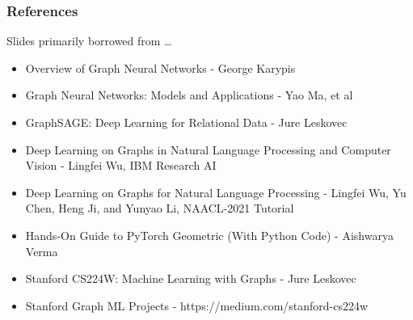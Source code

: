 \begin{frame}[fragile]\frametitle{References}
Slides primarily borrowed from \ldots

\begin{itemize}
\item Overview of Graph Neural Networks - George Karypis
\item Graph Neural Networks: Models and Applications - Yao Ma, et al
\item GraphSAGE: Deep Learning for Relational Data - Jure Leskovec
\item Deep Learning on Graphs in Natural Language Processing and Computer Vision - Lingfei Wu, IBM Research AI
\item Deep Learning on Graphs for Natural Language Processing - Lingfei Wu, Yu Chen, Heng Ji, and Yunyao Li, NAACL-2021 Tutorial
\item Hands-On Guide to PyTorch Geometric (With Python Code) - Aishwarya Verma
\item Stanford CS224W: Machine Learning with Graphs - Jure Leskovec
\item Stanford Graph ML Projects - https://medium.com/stanford-cs224w
\end{itemize}

\end{frame}
